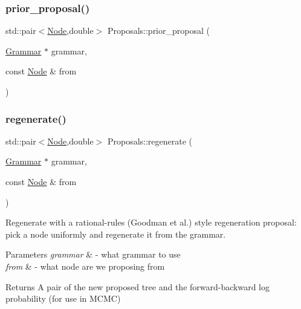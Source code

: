 \subsubsection{\texorpdfstring{prior\+\_\+proposal()}{prior\_proposal()}}
{\footnotesize\ttfamily std\+::pair$<$\hyperlink{class_node}{Node},double$>$ Proposals\+::prior\+\_\+proposal (\begin{DoxyParamCaption}\item[{\hyperlink{class_grammar}{Grammar} $\ast$}]{grammar,  }\item[{const \hyperlink{class_node}{Node} \&}]{from }\end{DoxyParamCaption})}

\mbox{\label{namespace_proposals_a186662fcd0316b831a4a08a8e64020b3}} 
\subsubsection{\texorpdfstring{regenerate()}{regenerate()}}
{\footnotesize\ttfamily std\+::pair$<$\hyperlink{class_node}{Node},double$>$ Proposals\+::regenerate (\begin{DoxyParamCaption}\item[{\hyperlink{class_grammar}{Grammar} $\ast$}]{grammar,  }\item[{const \hyperlink{class_node}{Node} \&}]{from }\end{DoxyParamCaption})}

Regenerate with a rational-\/rules (Goodman et al.) style regeneration proposal\+: pick a node uniformly and regenerate it from the grammar. 
\begin{DoxyParams}{Parameters}
{\em grammar} & -\/ what grammar to use \\
\hline
{\em from} & -\/ what node are we proposing from \\
\hline
\end{DoxyParams}
\begin{DoxyReturn}{Returns}
A pair of the new proposed tree and the forward-\/backward log probability (for use in M\+C\+MC)
\end{DoxyReturn}
